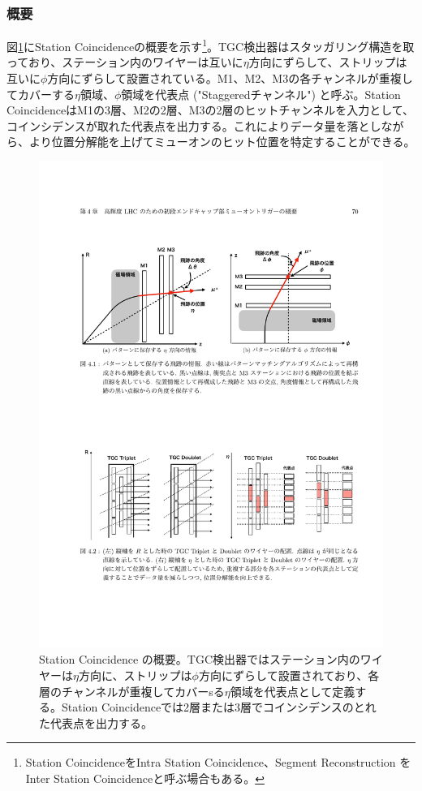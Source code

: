 \subsubsection*{概要}
図\ref{Concept_station}にStation Coincidenceの概要を示す\footnote{Station CoincidenceをIntra Station Coincidence、Segment Reconstruction を Inter Station Coincidenceと呼ぶ場合もある。}。TGC検出器はスタッガリング構造を取っており、ステーション内のワイヤーは互いに$\eta$方向にずらして、ストリップは互いに$\phi$方向にずらして設置されている。M1、M2、M3の各チャンネルが重複してカバーする$\eta$領域、$\phi$領域を代表点 ("Staggeredチャンネル") と呼ぶ。Station CoincidenceはM1の3層、M2の2層、M3の2層のヒットチャンネルを入力として、コインシデンスが取れた代表点を出力する。これによりデータ量を落としながら、より位置分解能を上げてミューオンのヒット位置を特定することができる。

\begin{figure} 
\centering
\includegraphics[width=16cm]{fig/SL/Concept_station.pdf}
\caption[Station コインシデンスの概要]{Station Coincidence の概要\cite{mt_mino}。TGC検出器ではステーション内のワイヤーは$\eta$方向に、ストリップは$\phi$方向にずらして設置されており、各層のチャンネルが重複してカバーsる$\eta$領域を代表点として定義する。Station Coincidenceでは2層または3層でコインシデンスのとれた代表点を出力する。}
\label{Concept_station}
\end{figure}

